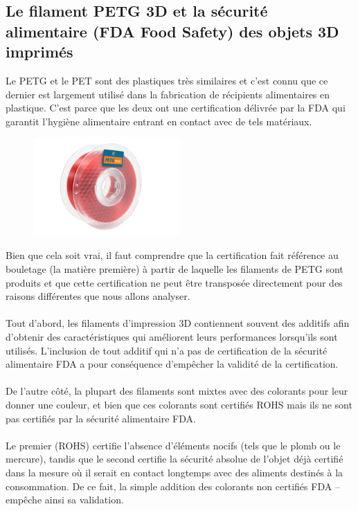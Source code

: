 \documentclass[11pt,a4paper]{article}
\begin{document}
	\subsection{Le filament PETG 3D et la sécurité alimentaire (FDA Food Safety) des objets 3D imprimés}Le PETG et le PET sont des plastiques très similaires et c’est connu  que ce dernier est largement utilisé dans la fabrication de récipients alimentaires en plastique. C'est parce que les deux ont une certification délivrée par la FDA qui garantit l’hygiène alimentaire entrant en contact avec de tels matériaux.
\begin{figure}[H]
\centering
\includegraphics[width=0.5\textwidth,cfbox=azul_marcos 1pt 0pt]{FOTOS/PETGKILOROJO}
\end{figure}
Bien que cela soit vrai, il faut comprendre que la certification fait référence au bouletage (la matière première) à partir de laquelle les filaments de PETG sont produits et que cette certification ne peut être transposée directement pour des raisons différentes que nous allons analyser.
\\\\
Tout d’abord, les filaments d’impression 3D contiennent souvent des additifs afin d’obtenir des caractéristiques qui améliorent leurs performances lorsqu’ils sont utilisés. L’inclusion de tout additif qui n’a pas de certification de la sécurité alimentaire FDA a pour conséquence d’empêcher la validité de la certification.
\\\\
De l’autre côté, la plupart des filaments sont mixtes avec des colorants pour leur donner une couleur, et bien que ces colorants sont certifiés ROHS mais ils ne sont pas certifiés par la sécurité alimentaire FDA.
\\\\
Le premier (ROHS) certifie l’absence d’éléments nocifs (tels que le plomb ou le mercure), tandis que le second certifie la sécurité absolue de l’objet déjà certifié dans la mesure où il serait en contact longtemps avec des aliments destinés à la consommation. De ce fait, la simple addition des colorants non certifiés FDA – empêche ainsi sa validation.
\end{document}
